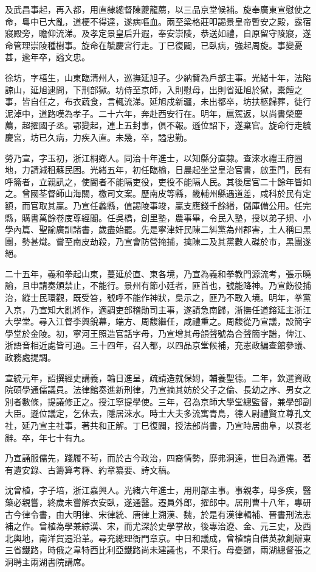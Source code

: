 \begin{pinyinscope}
及武昌事起，再入都，用直隸總督陳夔龍薦，以三品京堂候補。旋奉廣東宣慰使之命，粵中已大亂，道梗不得達，遂病嘔血。兩至梁格莊叩謁景皇帝暫安之殿，露宿寢殿旁，瞻仰流涕。及孝定景皇后升遐，奉安崇陵，恭送如禮，自原留守陵寢，遂命管理崇陵種樹事。旋命在毓慶宮行走。丁巳復闢，已臥病，強起周旋。事變憂甚，逾年卒，謚文忠。

徐坊，字梧生，山東臨清州人，巡撫延旭子。少納貲為戶部主事。光緒十年，法陷諒山，延旭逮問，下刑部獄。坊侍至京師，入則慰母，出則省延旭於獄，橐饘之事，皆自任之，布衣蔬食，言輒流涕。延旭戍新疆，未出都卒，坊扶柩歸葬，徒行泥淖中，道路嘆為孝子。二十六年，奔赴西安行在。明年，扈駕返，以尚書榮慶薦，超擢國子丞。鄂變起，連上五封事，俱不報。遜位詔下，遂棄官。旋命行走毓慶宮，坊已久病，力疾入直。未幾，卒，謚忠勤。

勞乃宣，字玉初，浙江桐鄉人。同治十年進士，以知縣分直隸。查淶水禮王府圈地，力請減租蘇民困。光緒五年，初任臨榆，日晨起坐堂皇治官書，啟重門，民有呼籥者，立親訊之，使閽者不能隔吏役，吏役不能隔人民。其後居官二十餘年皆如之。曾國荃督師山海關，檄司文案。歷南皮等縣，畿輔州縣遇道差，咸科於民有定額，而官取其贏。乃宣任蠡縣，值謁陵事竣，贏支應錢千餘緡，儲庫備公用。任完縣，購書萬餘卷庋尊經閣。任吳橋，創里塾，農事畢，令民入塾，授以弟子規、小學內篇、聖諭廣訓諸書，歲盡始罷。先是寧津奸民陳二糾黨為州郡害，土人稱曰黑團，勢甚熾。嘗至南皮劫殺，乃宣會防營掩捕，擒陳二及其黨數人磔於市，黑團遂絕。

二十五年，義和拳起山東，蔓延於直、東各境，乃宣為義和拳教門源流考，張示曉諭，且申請奏頒禁止，不能行。景州有節小廷者，匪首也，號能降神。乃宣飭役捕治，縱士民環觀，既受笞，號呼不能作神狀，梟示之，匪乃不敢入境。明年，拳黨入京，乃宣知大亂將作，適調吏部稽勛司主事，遂請急南歸，浙撫任道鎔延主浙江大學堂。尋入江督李興銳幕，端方、周馥繼任，咸禮重之。周馥從乃宣議，設簡字學堂於金陵。初，寧河王照造官話字母，乃宣增其母韻聲號為合聲簡字譜，俾江、浙語音相近處皆可通。三十四年，召入都，以四品京堂候補，充憲政編查館參議、政務處提調。

宣統元年，詔撰經史講義，輪日進呈，疏請造就保姆，輔養聖德。二年，欽選資政院碩學通儒議員。法律館奏進新刑律，乃宣摘其妨於父子之倫、長幼之序、男女之別者數條，提議修正之。授江寧提學使。三年，召為京師大學堂總監督，兼學部副大臣。遜位議定，乞休去，隱居淶水。時士大夫多流寓青島，德人尉禮賢立尊孔文社，延乃宣主社事，著共和正解。丁巳復闢，授法部尚書，乃宣時居曲阜，以衰老辭。卒，年七十有九。

乃宣誦服儒先，踐履不茍，而於古今政治，四裔情勢，靡弗洞達，世目為通儒。著有遺安錄、古籌算考釋、約章纂要、詩文稿。

沈曾植，字子培，浙江嘉興人。光緒六年進士，用刑部主事。事親孝，母多疾，醫藥必親嘗，終歲未嘗解衣安臥，遂通醫。遷員外郎，擢郎中。居刑曹十八年，專研古今律令書，由大明律、宋律統、唐律上溯漢、魏，於是有漢律輯補、晉書刑法志補之作。曾植為學兼綜漢、宋，而尤深於史學掌故，後專治遼、金、元三史，及西北輿地，南洋貿遷沿革。尋充總理衙門章京。中日和議成，曾植請自借英款創辦東三省鐵路，時俄之韋特西比利亞鐵路尚未建議也，不果行。母憂歸，兩湖總督張之洞聘主兩湖書院講席。


\end{pinyinscope}
